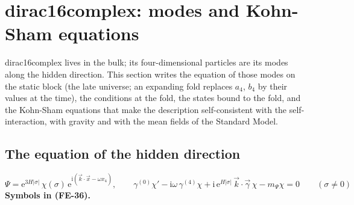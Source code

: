 \documentclass[
  10pt,
]{article}
\begin{document}
\hypertarget{dirac16complex-modes-and-kohn-sham-equations}{%
\section{dirac16complex: modes and Kohn-Sham
equations}\label{dirac16complex-modes-and-kohn-sham-equations}}

dirac16complex lives in the bulk; its four-dimensional particles are its
modes along the hidden direction. This section writes the equation of
those modes on the static block (the late universe; an expanding fold
replaces \(a_4\), \(b_4\) by their values at the time), the conditions
at the fold, the states bound to the fold, and the Kohn-Sham equations
that make the description self-consistent with the self-interaction,
with gravity and with the mean fields of the Standard Model.

\hypertarget{the-equation-of-the-hidden-direction}{%
\subsection{The equation of the hidden
direction}\label{the-equation-of-the-hidden-direction}}

\[
\Psi = \mathrm{e}^{3H\lvert\sigma\rvert}\,\chi(\sigma)\,\mathrm{e}^{\mathrm{i}(\vec k\cdot\vec x - \omega x_4)},\qquad
\gamma^{(0)}\chi' - \mathrm{i}\omega\,\gamma^{(4)}\chi + \mathrm{i}\,\mathrm{e}^{H\lvert\sigma\rvert}\,\vec k\cdot\vec\gamma\,\chi
 - m_\Psi\chi = 0\qquad(\sigma \ne 0) \tag{FE-36}
\] \textbf{Symbols in (FE-36).}
\end{document}
